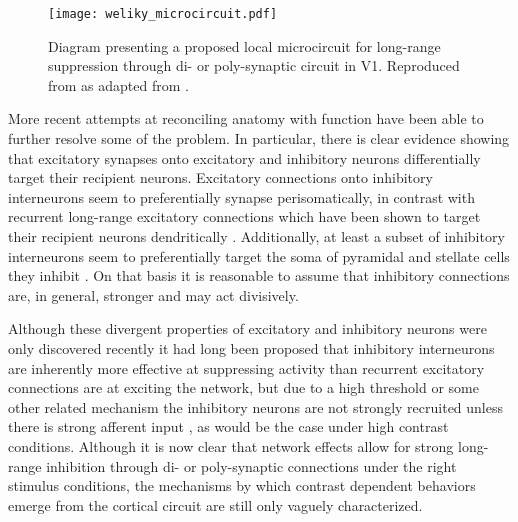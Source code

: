 \begin{figure}
	\centering
        \texttt{[image: weliky\_microcircuit.pdf]}
	\caption{Diagram presenting a proposed local microcircuit for
      long-range suppression through di- or poly-synaptic circuit in
      V1. Reproduced from \cite{Miikkulainen2005b} as adapted from
      \cite{Weliky1995}.}
	\label{V1MicroCircuit}
\end{figure}

More recent attempts at reconciling anatomy with function have been
able to further resolve some of the problem. In particular, there is
clear evidence showing that excitatory synapses onto excitatory and
inhibitory neurons differentially target their recipient
neurons. Excitatory connections onto inhibitory interneurons seem to
preferentially synapse perisomatically, in contrast with recurrent
long-range excitatory connections which have been shown to target
their recipient neurons dendritically
\citep{Gilbert1990,McGuire1991}. Additionally, at least a subset of
inhibitory interneurons seem to preferentially target the soma of
pyramidal and stellate cells they inhibit \citep{Markram2004}. On that
basis it is reasonable to assume that inhibitory connections are, in
general, stronger and may act divisively.

Although these divergent properties of excitatory and inhibitory
neurons were only discovered recently it had long been proposed that
inhibitory interneurons are inherently more effective at suppressing
activity than recurrent excitatory connections are at exciting the
network, but due to a high threshold or some other related mechanism
the inhibitory neurons are not strongly recruited unless there is
strong afferent input \citep{Sillito1979}, as would be the case under
high contrast conditions. Although it is now clear that network
effects allow for strong long-range inhibition through di- or
poly-synaptic connections under the right stimulus conditions, the
mechanisms by which contrast dependent behaviors emerge from the
cortical circuit are still only vaguely characterized.

